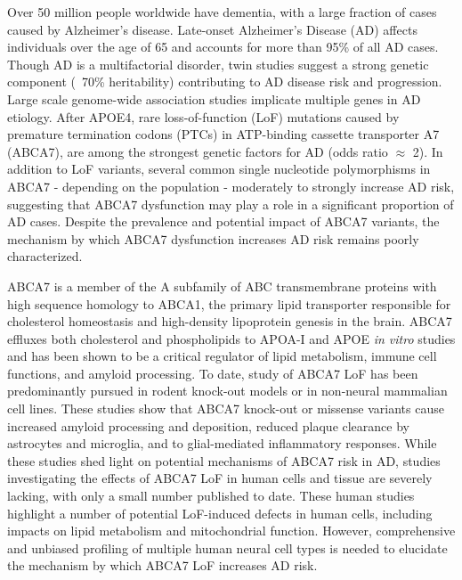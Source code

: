 Over 50 million people worldwide have dementia, with a large fraction of cases caused by Alzheimer’s disease\cite{Alzheimers_Disease_International2020-xv}. Late-onset Alzheimer’s Disease (AD) affects individuals over the age of 65 and accounts for more than 95\% of all AD cases\cite{Alzheimers_Association2016-vq}. Though AD is a multifactorial disorder, twin studies suggest a strong genetic component (~70\% heritability)\cite{Karlsson2022-vv} contributing to AD disease risk and progression. Large scale genome-wide association studies implicate multiple genes in AD etiology\cite{Lambert2013-km,Marioni2019-os,Jansen2019-ww,Kunkle2019-yo,De_Rojas2021-gu,Wightman2021-km,Bellenguez2022-ao,Belloy2023-kj}. After APOE4, rare loss-of-function (LoF) mutations caused by premature termination codons (PTCs) in ATP-binding cassette transporter A7 (ABCA7), are among the strongest genetic factors for AD (odds ratio $\approx$ 2)\cite{Steinberg2015-mu,De_Roeck2019-te,Reitz2013-eo,Bellenguez2022-ao,Holstege2022-vp,Lyssenko2021-gw}. In addition to LoF variants, several common single nucleotide polymorphisms in ABCA7 - depending on the population - moderately\cite{Steinberg2015-mu,De_Roeck2019-te,Reitz2013-eo,Bellenguez2022-ao,Le_Guennec2016-nl,Hollingworth2011-tr,Naj2011-bs} to strongly\cite{Reitz2013-eo} increase AD risk, suggesting that ABCA7 dysfunction may play a role in a significant proportion of AD cases. Despite the prevalence and potential impact of ABCA7 variants, the mechanism by which ABCA7 dysfunction increases AD risk remains poorly characterized. 

ABCA7 is a member of the A subfamily of ABC transmembrane proteins\cite{Kim2008-zi} with high sequence homology to ABCA1, the primary lipid transporter responsible for cholesterol homeostasis and high-density lipoprotein genesis in the brain\cite{Koldamova2014-kd}. ABCA7 effluxes both cholesterol and phospholipids to APOA-I and APOE \textit{in vitro} studies\cite{Abe-Dohmae2004-wb,Wang2003-wh,Tomioka2017-nv,Picataggi2022-yp,Quazi2013-pe,Fang2025} and has been shown to be a critical regulator of lipid metabolism, immune cell functions, and amyloid processing\cite{Aikawa2018-ek,Tanaka2011-zo,Duchateau2023-ji,Kawatani2023-vf,Tayran2024-bo}. To date, study of ABCA7 LoF has been predominantly pursued in rodent knock-out models or in non-neural mammalian cell lines. These studies show that ABCA7 knock-out or missense variants  cause increased amyloid processing and deposition\cite{Satoh2015-yu,Sakae2016-uy,Chan2008-qu,Bamji-Mirza2018-xt}, reduced plaque clearance by astrocytes and microglia\cite{Kim2013-sv,Fu2016-qe}, and to glial-mediated inflammatory responses\cite{Aikawa2019-hv,Aikawa2021-vz}.  While these studies shed light on potential mechanisms of ABCA7 risk in AD, studies investigating the effects of ABCA7 LoF in human cells and tissue are severely lacking, with only a small number published to date\cite{Kawatani2023-vf,Allen2017-vw,Liu2021-zh,Bamji-Mirza2018-xt}.  These human studies highlight a number of potential LoF-induced defects in human cells, including impacts on lipid metabolism and mitochondrial function\cite{Kawatani2023-vf}. However, comprehensive and unbiased profiling of multiple human neural cell types is needed to elucidate the mechanism by which ABCA7 LoF increases AD risk.

